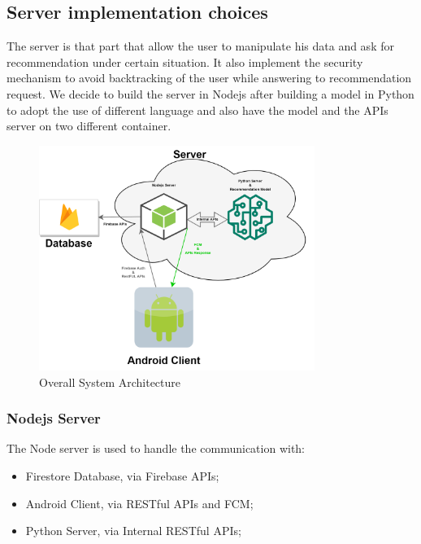 \documentclass[../../main]{subfiles}
\begin{document}
\label{ss:server-implementation-choices}
\subsection{Server implementation choices}

The server is that part that allow the user to manipulate his data and ask for recommendation under certain situation.
It also implement the security mechanism to avoid backtracking of the user while answering to recommendation request.
We decide to build the server in Nodejs after building a model in Python to adopt the use of different language and also
have the model and the APIs server on two different container. 

\begin{figure}[h]
    \centering
    \includegraphics[width=0.8\textwidth]{images/system_architecture}
    \caption{Overall System Architecture}\label{fig:system_architecture}
\end{figure}

\subsubsection{Nodejs Server}
The Node server is used to handle the communication with:
\begin{itemize}
    \item Firestore Database, via Firebase APIs;
    \item Android Client, via RESTful APIs and FCM;
    \item Python Server, via Internal RESTful APIs;
\end{itemize}
\end{document}
